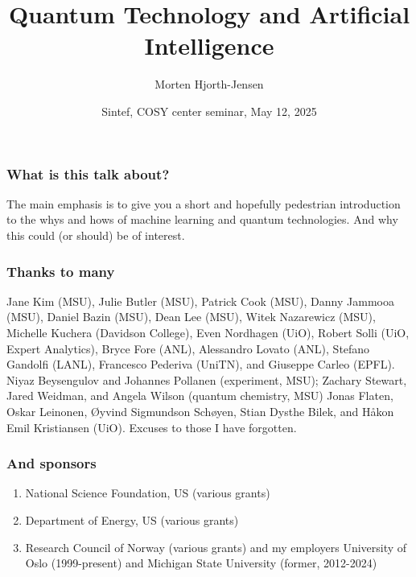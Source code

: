 \documentclass{beamer}
\begin{document}
\title[Quantum Computing and ML]{\textbf{Quantum Technology and Artificial Intelligence}}
\author{Morten Hjorth-Jensen}
\date{Sintef, COSY center seminar, May 12, 2025}





\begin{frame}
\titlepage
\end{frame}

\begin{frame}
\frametitle{What is this talk about?}

\begin{block}{}
The main emphasis is to give you a short and hopefully pedestrian introduction to the whys and hows of machine learning and quantum technologies.
And why this could (or should) be of interest. 
\end{block}

\end{frame}

\begin{frame}
\frametitle{Thanks to many}

Jane Kim (MSU), Julie Butler (MSU), Patrick Cook (MSU), Danny Jammooa (MSU), Daniel Bazin (MSU), Dean Lee (MSU), Witek Nazarewicz (MSU), Michelle Kuchera (Davidson College), Even Nordhagen (UiO), Robert Solli (UiO, Expert Analytics), Bryce Fore (ANL), Alessandro Lovato (ANL), Stefano Gandolfi (LANL), Francesco Pederiva (UniTN), and Giuseppe Carleo (EPFL). 
Niyaz Beysengulov and Johannes Pollanen (experiment, MSU); Zachary Stewart, Jared Weidman, and Angela Wilson (quantum chemistry, MSU)
Jonas Flaten, Oskar Leinonen, Øyvind Sigmundson Schøyen, Stian Dysthe Bilek, and Håkon Emil Kristiansen (UiO). Excuses to those I have forgotten.
\end{frame}

\begin{frame}
\frametitle{And sponsors}

\begin{enumerate}
\item National Science Foundation, US (various grants)

\item Department of Energy, US (various grants)

\item Research Council of Norway (various grants) and my employers University of Oslo (1999-present) and Michigan State University (former, 2012-2024)
\end{enumerate}

\end{frame}
\end{document}
